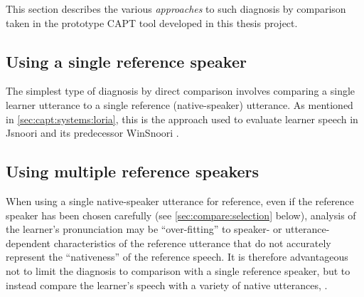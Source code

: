 This section describes the various \textit{approaches} to such diagnosis by comparison taken in the prototype CAPT tool developed in this thesis project. 
  



	
	\subsection{Using a single reference speaker}
	\label{sec:compare:single}
	
	
	The simplest type of diagnosis by direct comparison involves comparing a single learner utterance to a single reference (native-speaker) utterance. 
	As mentioned in \cref{sec:capt:systems:loria}, this is the approach used to evaluate learner speech in Jsnoori and its predecessor WinSnoori \citep{Bonneau2004,Henry2007,Bonneau2011}. 

	
	




	\subsection{Using multiple reference speakers}
	\label{sec:compare:multi}
	
	When using a single native-speaker utterance for reference, even if the reference speaker has been chosen carefully (see \cref{sec:compare:selection} below), analysis of the learner's pronunciation may be ``over-fitting'' to speaker- or utterance-dependent characteristics of the reference utterance that do not accurately represent the ``nativeness'' of the reference speech. It is therefore advantageous not to limit the diagnosis to comparison with a single reference speaker, but to instead compare the learner's speech with a variety of native utterances, .
	
